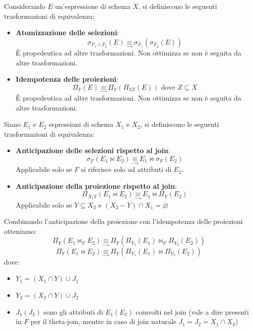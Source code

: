 \documentclass[a4paper,twoside]{article}
\begin{document}
\vspace{1em}
\noindent
Considerando \( E \) un'espressione di schema \( X \), si definiscono le seguenti
trasformazioni di equivalenza:
\begin{itemize}
  \item \textbf{Atomizzazione delle selezioni}:
    \[
      \sigma_{F_1 \land F_2}(E) \underset{\longrightarrow}{\equiv} \sigma_{F_1}(\sigma_{F_2}(E))
    \] 
    È propedeutica ad altre trasformazioni. Non ottimizza se non è seguita da altre trasformazioni.

  \item \textbf{Idempotenza delle proiezioni}:
    \[
      \Pi_Y(E) \underset{\longrightarrow}{\equiv} \Pi_Y(\Pi_{YZ}(E)) \text{ dove } Z \subseteq X
    \] 
    È propedeutica ad altre trasformazioni. Non ottimizza se non è seguita da altre trasformazioni.
\end{itemize}

\vspace{1em}
\noindent
Siano \( E_1 \) e \( E_2 \) espressioni di schema \( X_1 \) e \( X_2 \), si definiscono le
seguenti trasformazioni di equivalenza:
\begin{itemize}
  \item \textbf{Anticipazione delle selezioni rispetto al join}:
    \[
      \sigma_F(E_1 \bowtie E_2) \underset{\longrightarrow}{\equiv} E_1 \bowtie \sigma_F(E_2)
    \]
    Applicabile solo se \( F \) si riferisce solo ad attributi di \( E_2 \).
  \item \textbf{Anticipazione della proiezione rispetto al join}:
    \[
      \Pi_{X_1 Y}(E_1 \bowtie E_2) \underset{\longrightarrow}{\equiv} E_1 \bowtie \Pi_Y(E_2)
    \]
    Applicabile solo se \( Y \subseteq X_2 \) e \( (X_2 - Y) \cap X_1 = \varnothing \)
\end{itemize}


\vspace{1em}
\noindent
Combinando l’anticipazione della proiezione con l'idempotenza delle proiezioni otteniamo:
\[
  \Pi_Y \left( E_1 \bowtie_F E_2 \right) \underset{\longrightarrow}{\equiv} \Pi_{Y} \left( \Pi_{Y_1}(E_1) \bowtie_F \Pi_{Y_2}(E_2) \right)
\]
\[
  \Pi_Y \left( E_1 \bowtie E_2 \right) \underset{\longrightarrow}{\equiv} \Pi_{Y} \left( \Pi_{Y_1}(E_1) \bowtie \Pi_{Y_2}(E_2) \right)
\] 
dove:
\begin{itemize}
  \item \( Y_1 = (X_1 \cap Y) \cup J_1 \)
  \item \( Y_2 = (X_2 \cap Y) \cup J_2 \)
  \item \( J_1 (J_2) \) sono gli attributi di \( E_1 (E_2) \) coinvolti nel join
    (vale a dire presenti in \( F \) per il theta-join, mentre in caso di join naturale
    \( J_1 = J_2 = X_1 \cap X_2 \))
\end{itemize}
\end{document}
